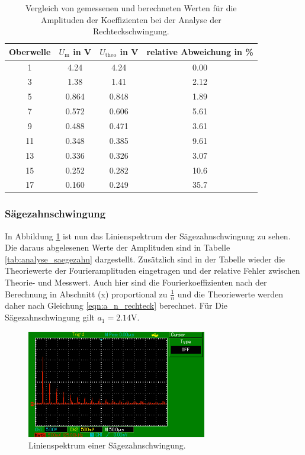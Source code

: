 \begin{table}
  \centering
  \begin{tabular}{c c c c}
    \toprule
    Oberwelle & $U_\text{m}$ in \si{\volt} & $U_\text{theo}$ in \si{\volt} &
    relative Abweichung in \% \\
    \midrule
    1  & 4.24  & 4.24  & 0.00 \\
    3  & 1.38  & 1.41  & 2.12 \\
    5  & 0.864 & 0.848 & 1.89 \\
    7  & 0.572 & 0.606 & 5.61 \\
    9  & 0.488 & 0.471 & 3.61 \\
    11 & 0.348 & 0.385 & 9.61 \\
    13 & 0.336 & 0.326 & 3.07 \\
    15 & 0.252 & 0.282 & 10.6 \\
    17 & 0.160 & 0.249 & 35.7 \\
    \bottomrule
  \end{tabular}
  \caption{Vergleich von gemessenen und berechneten Werten für die Amplituden
    der Koeffizienten bei der Analyse der Rechteckschwingung.}
  \label{tab:analyse_rechteck}
\end{table}

\subsubsection{Sägezahnschwingung}
In Abbildung \ref{fig:linienspektrum_saegezahn} ist nun das Linienspektrum der
Sägezahnschwingung zu sehen. Die daraus abgelesenen Werte der Amplituden sind in
Tabelle \ref{tab:analyse_saegezahn} dargestellt. Zusätzlich sind in der Tabelle
wieder die Theoriewerte der Fourieramplituden eingetragen und der relative Fehler
zwischen Theorie- und Messwert.
Auch hier sind die Fourierkoeffizienten nach der Berechnung in Abschnitt (x)
proportional zu $\frac{1}{n}$ und die Theoriewerte werden daher nach Gleichung
\eqref{eqn:a_n_rechteck} berechnet. Für Die Sägezahnschwingung gilt $a_1 = 2.14
\si{\volt}$.

\begin{figure}
  \centering
  \includegraphics[width=0.7\textwidth]{linienspektrum_saegezahn.png}
  \caption{Linienspektrum einer Sägezahnschwingung.}
  \label{fig:linienspektrum_saegezahn}
\end{figure}

